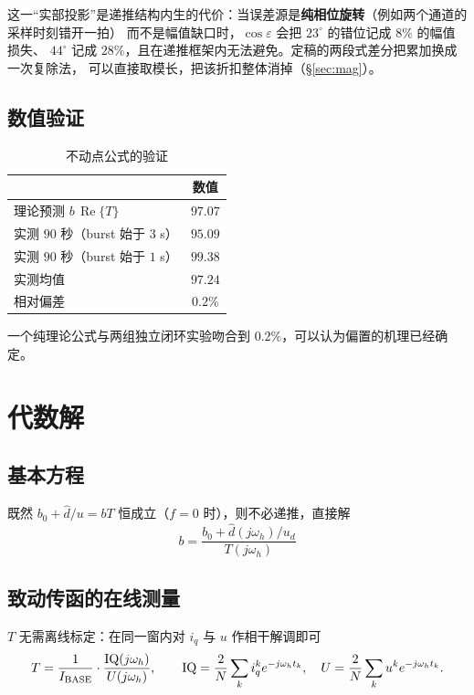 \documentclass[11pt,a4paper]{ctexart}
\newcommand{\RE}{\operatorname{Re}}
\begin{document}
这一“实部投影”是递推结构内生的代价：当误差源是\textbf{纯相位旋转}（例如两个通道的采样时刻错开一拍）
而不是幅值缺口时，$\cos\varepsilon$ 会把 $23^\circ$ 的错位记成 $8\%$ 的幅值损失、
$44^\circ$ 记成 $28\%$，且在递推框架内无法避免。定稿的两段式差分把累加换成一次复除法，
可以直接取模长，把该折扣整体消掉（\S\ref{sec:mag}）。

\subsection{数值验证}

\begin{table}[h]
\centering
\caption{不动点公式的验证}
\label{tab:fp}
\begin{tabular}{lc}
\toprule
& 数值 \\
\midrule
理论预测 $b\,\RE\{T\}$ & $97.07$ \\
实测 $90$ 秒（burst 始于 $3$ s） & $95.09$ \\
实测 $90$ 秒（burst 始于 $1$ s） & $99.38$ \\
实测均值 & $97.24$ \\
相对偏差 & $0.2\%$ \\
\bottomrule
\end{tabular}
\end{table}

一个纯理论公式与两组独立闭环实验吻合到 $0.2\%$，可以认为偏置的机理已经确定。

\section{代数解}

\subsection{基本方程}

既然 $b_0+\hat d/u=bT$ 恒成立（$f=0$ 时），则不必递推，直接解
\begin{equation}
\boxed{\;b=\frac{b_0+\hat d(j\omega_h)/u_d}{T(j\omega_h)}\;}
\label{eq:alg}
\end{equation}

\subsection{致动传函的在线测量}

$T$ 无需离线标定：在同一窗内对 $i_q$ 与 $u$ 作相干解调即可
\begin{equation}
T=\frac{1}{I_{\rm BASE}}\cdot\frac{\mathrm{IQ}(j\omega_h)}{U(j\omega_h)},\qquad
\mathrm{IQ}=\frac{2}{N}\sum_k i_q^k e^{-j\omega_h t_k},\quad U=\frac{2}{N}\sum_k u^k e^{-j\omega_h t_k}.
\label{eq:Tmeas}
\end{equation}
\end{document}
